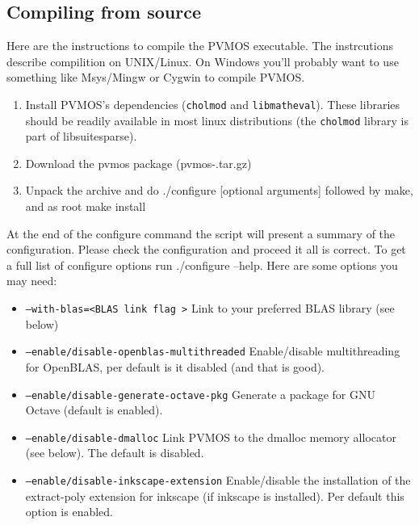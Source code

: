 \documentclass[noshowpacs,preprintnumbers,amsmath,amssymb, letter]{revtex4}
\begin{document}
\subsection{Compiling from source}
Here are the instructions to compile the PVMOS executable. The instrcutions describe compilition on UNIX/Linux. On Windows you'll probably want to use something like Msys/Mingw or Cygwin to compile PVMOS.
\begin{enumerate}
\item{} Install PVMOS's dependencies (\texttt{cholmod} and \texttt{libmatheval}). These libraries should be readily available in most linux distributions (the \texttt{cholmod} library is part of libsuitesparse).
\item{} Download the pvmos package (pvmos-\version.tar.gz)
\item{} Unpack the archive and do ./configure [optional arguments] followed by  make, and as root make install
\end{enumerate}
At the end of the configure command the script will present a summary of the configuration. Please check the configuration and proceed it all is correct. To get a full list of configure options run ./configure --help. Here are some options you may need:
\begin{itemize}
\item{\texttt{--with-blas=\textless BLAS link flag \textgreater}} Link to your preferred BLAS library (see below)
\item{\texttt{--enable/disable-openblas-multithreaded}} Enable/disable multithreading for OpenBLAS, per default is it disabled (and that is good).
\item{\texttt{--enable/disable-generate-octave-pkg}} Generate a package for GNU Octave (default is enabled).
\item{\texttt{--enable/disable-dmalloc}} Link PVMOS to the dmalloc memory allocator (see below). The default is disabled.
\item{\texttt{--enable/disable-inkscape-extension}} Enable/disable the installation of the extract-poly extension for inkscape (if inkscape is installed). Per default this option is enabled.
\end{itemize}
\end{document}

